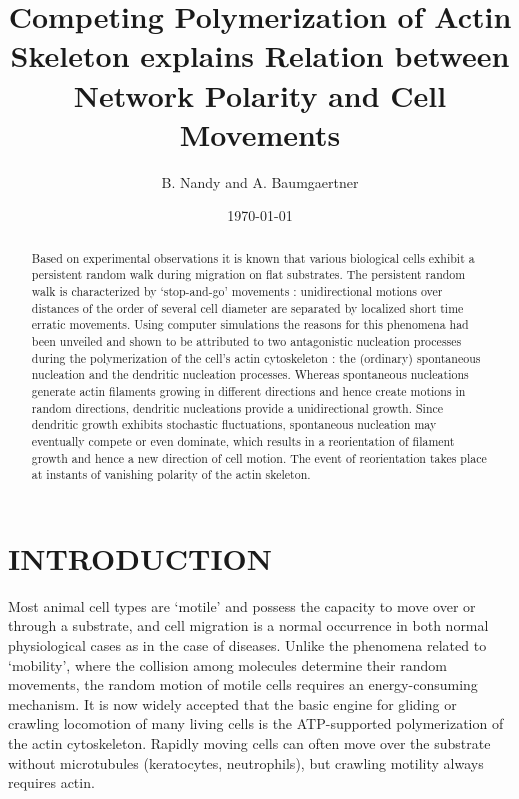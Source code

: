 \documentclass[aps,preprint,pre,array,epsfig,eqsecnum]{revtex4}
\begin{document}
   
\setlength{\parindent}{0pt}


\title{Competing Polymerization of Actin Skeleton explains Relation between
Network Polarity and Cell Movements}


\author{B. Nandy and A. Baumgaertner}



\date{\today}
 

\begin{abstract} 

Based on experimental observations it is known that various biological
cells exhibit a persistent random walk during migration on flat substrates.
The persistent random walk is characterized by `stop-and-go' movements :
unidirectional motions over distances of the
order of several cell diameter are separated by localized short time
erratic movements.
Using computer simulations the reasons for this phenomena had been unveiled and
shown to be attributed to two antagonistic nucleation processes during
the polymerization of the cell's actin cytoskeleton : the (ordinary) spontaneous
nucleation and the dendritic nucleation processes.
Whereas spontaneous nucleations generate actin filaments growing in different 
directions and hence create motions in random directions, 
dendritic nucleations provide a unidirectional growth.
Since dendritic growth exhibits stochastic fluctuations,
spontaneous nucleation may eventually compete or even dominate, 
which results in a reorientation of filament growth and hence 
a new direction of cell motion.
The event of reorientation takes place at instants of vanishing
polarity of the actin skeleton.

\end{abstract}

      

\maketitle

\section{INTRODUCTION}

Most animal cell types are `motile' and 
possess the capacity to move over or through 
a substrate, and cell migration is a normal occurrence in both normal
physiological cases as in the case of diseases.
%
Unlike the phenomena related to `mobility', where the collision among molecules
determine their random movements, the random motion of motile cells
requires an energy-consuming mechanism. 
%
It is now widely accepted that the basic engine for gliding or 
crawling locomotion of many living cells is the ATP-supported 
polymerization of the actin cytoskeleton.
%
Rapidly moving cells 
can often move over the substrate without microtubules (keratocytes,
neutrophils), but crawling motility always requires actin. 
\end{document}
